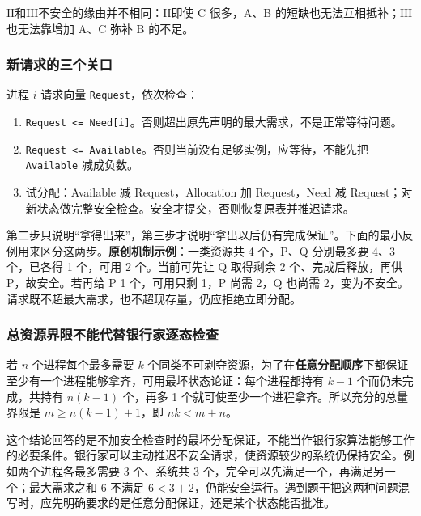 \ensuremath{\mathrm{II}}和\ensuremath{\mathrm{III}}不安全的缘由并不相同：\ensuremath{\mathrm{II}}即使 C 很多，A、B 的短缺也无法互相抵补；\ensuremath{\mathrm{III}}也无法靠增加 A、C 弥补 B 的不足。

\subsubsection{新请求的三个关口}\label{OS02-auto-27}

进程 \(i\) 请求向量 \texttt{Request}，依次检查：

\begin{enumerate}
\def\labelenumi{\arabic{enumi}.}
\tightlist
\item
  \texttt{Request <\allowbreak{}=\allowbreak{} Need[i]}。否则超出原先声明的最大需求，不是正常等待问题。
\item
  \texttt{Request <\allowbreak{}=\allowbreak{} Available}。否则当前没有足够实例，应等待，不能先把 \texttt{Available} 减成负数。
\item
  试分配：Available 减 Request，Allocation 加 Request，Need 减 Request；对新状态做完整安全检查。安全才提交，否则恢复原表并推迟请求。
\end{enumerate}

第二步只说明``拿得出来''，第三步才说明``拿出以后仍有完成保证''。下面的最小反例用来区分这两步。\textbf{原创机制示例}：一类资源共 4 个，P、Q 分别最多要 4、3 个，已各得 1 个，可用 2 个。当前可先让 Q 取得剩余 2 个、完成后释放，再供 P，故安全。若再给 P 1 个，可用只剩 1，P 尚需 2，Q 也尚需 2，变为不安全。请求既不超最大需求，也不超现存量，仍应拒绝立即分配。

\subsubsection{总资源界限不能代替银行家逐态检查}\label{OS02-auto-28}

若 \(n\) 个进程每个最多需要 \(k\) 个同类不可剥夺资源，为了在\textbf{任意分配顺序}下都保证至少有一个进程能够拿齐，可用最坏状态论证：每个进程都持有 \(k-1\) 个而仍未完成，共持有 \(n(k-1)\) 个，再多 1 个就可使至少一个进程拿齐。所以充分的总量界限是 \(m\ge n(k-1)+1\)，即 \(nk<m+n\)。

这个结论回答的是不加安全检查时的最坏分配保证，不能当作银行家算法能够工作的必要条件。银行家可以主动推迟不安全请求，使资源较少的系统仍保持安全。例如两个进程各最多需要 3 个、系统共 3 个，完全可以先满足一个，再满足另一个；最大需求之和 6 不满足 \(6<3+2\)，仍能安全运行。遇到题干把这两种问题混写时，应先明确要求的是任意分配保证，还是某个状态能否批准。

